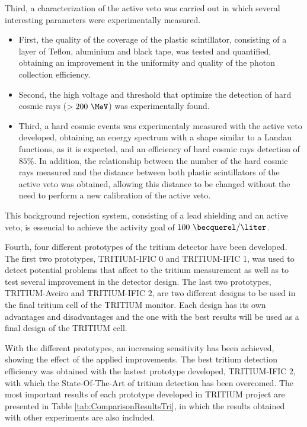 Third, a characterization of the active veto was carried out in which several interesting parameters were experimentally measured.

\begin{itemize}

\item{} First, the quality of the coverage of the plastic scintillator, consisting of a layer of Teflon, aluminium and black tape, was tested and quantified, obtaining an improvement in the uniformity and quality of the photon collection efficiency.

\item{} Second, the high voltage and threshold that optimize the detection of hard cosmic rays ($>200~\MeV$) was experimentally found.

\item{} Third, a hard cosmic events was experimentaly measured with the active veto developed, obtaining an energy spectrum with a shape similar to a Landau functions, as it is expected, and an efficiency of hard cosmic rays detection of $85\%$. In addition, the relationship between the number of the hard cosmic rays measured and the distance between both plastic scintillators of the active veto was obtained, allowing this distance to be changed without the need to perform a new calibration of the active veto.

\end{itemize}

This background rejection system, consisting of a lead shielding and an active veto, is essencial to achieve the activity goal of $100~\becquerel/\liter$.

Fourth, four different prototypes of the tritium detector have been developed. The first two prototypes, TRITIUM-IFIC 0 and TRITIUM-IFIC 1, was used to detect potential problems that affect to the tritium measurement as well as to test several improvement in the detector design. The last two prototypes, TRITIUM-Aveiro and TRITIUM-IFIC 2, are two different designs to be used in the final tritium cell of the TRITIUM monitor. Each design has its own advantages and disadvantages and the one with the best results will be used as a final design of the TRITIUM cell.

With the different prototypes, an increasing sensitivity has been achieved, showing the effect of the applied improvements. The best tritium detection efficiency was obtained with the lastest prototype developed, TRITIUM-IFIC 2, with which the State-Of-The-Art of tritium detection has been overcomed. The most important results of each prototype developed in TRITIUM project are presented in Table \ref{tab:ComparisonResultsTri}, in which the results obtained with other experiments are also included.

